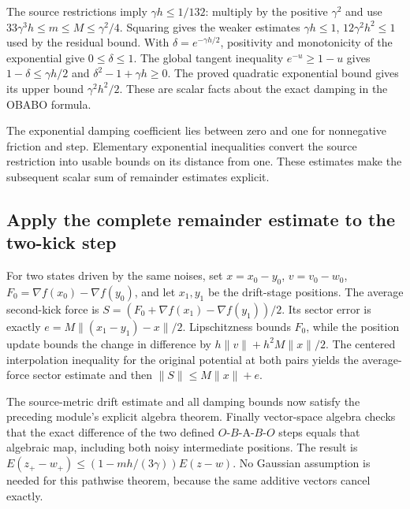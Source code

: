 \documentclass[11pt,a4paper]{report}
\begin{document}
The source restrictions imply \(\gamma h\le1/132\): multiply by the positive \(\gamma^2\) and use \(33\gamma^3h\le m\le M\le\gamma^2/4\). Squaring gives the weaker estimates \(\gamma h\le1\), \(12\gamma^2h^2\le1\) used by the residual bound. With \(\delta=e^{-\gamma h/2}\), positivity and monotonicity of the exponential give \(0\le\delta\le1\). The global tangent inequality \(e^{-u}\ge1-u\) gives \(1-\delta\le\gamma h/2\) and \(\delta^2-1+\gamma h\ge0\). The proved quadratic exponential bound gives its upper bound \(\gamma^2h^2/2\). These are scalar facts about the exact damping in the OBABO formula.



The exponential damping coefficient lies between zero and one for nonnegative friction and step. Elementary exponential inequalities convert the source restriction into usable bounds on its distance from one. These estimates make the subsequent scalar sum of remainder estimates explicit.

\subsection{\texorpdfstring{Apply the complete remainder estimate to the two-kick step}{Apply the complete remainder estimate to the two-kick step}}
\label{report-step-KineticLangevin-OBABOContraction-lean-2}


For two states driven by the same noises, set \(x=x_0-y_0\), \(v=v_0-w_0\), \(F_0=\nabla f(x_0)-\nabla f(y_0)\), and let \(x_1,y_1\) be the drift-stage positions. The average second-kick force is \(S=(F_0+\nabla f(x_1)-\nabla f(y_1))/2\). Its sector error is exactly \(e=M\|(x_1-y_1)-x\|/2\). Lipschitzness bounds \(F_0\), while the position update bounds the change in difference by \(h\|v\|+h^2M\|x\|/2\). The centered interpolation inequality for the original potential at both pairs yields the average-force sector estimate and then \(\|S\|\le M\|x\|+e\).



The source-metric drift estimate and all damping bounds now satisfy the preceding module’s explicit algebra theorem. Finally vector-space algebra checks that the exact difference of the two defined \(O\)-\(B\)-A-\(B\)-\(O\) steps equals that algebraic map, including both noisy intermediate positions. The result is \(E(z_+-w_+)\le(1-mh/(3\gamma))E(z-w)\). No Gaussian assumption is needed for this pathwise theorem, because the same additive vectors cancel exactly.
\end{document}
